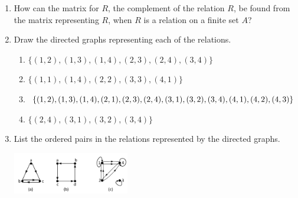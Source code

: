 \documentclass{sig-alternate-05-2015}
\begin{document}
\begin{enumerate}
\item How can the matrix for $R$, the complement of the
relation $R$, be found from the matrix representing $R$,
when $R$ is a relation on a finite set $A$?

\item Draw the directed graphs representing each of the relations.
\begin{enumerate}
	\item $\{(1, 2), (1, 3), (1, 4), (2, 3), (2, 4), (3, 4)\}$
	\item $\{(1, 1), (1, 4), (2, 2), (3, 3), (4, 1)\}$
	\item $\{(1, 2), (1, 3), (1, 4), (2, 1), (2, 3), (2, 4),\\ (3, 1), (3, 2),
		(3, 4), (4, 1), (4, 2), (4, 3)\}$
	\item $\{(2, 4), (3, 1), (3, 2), (3, 4)\}$
\end{enumerate}

\item List the ordered pairs in the relations represented by the directed graphs.

	\includegraphics[width=0.4\textwidth]{figs/123.pdf}
\end{enumerate}
\end{document}
